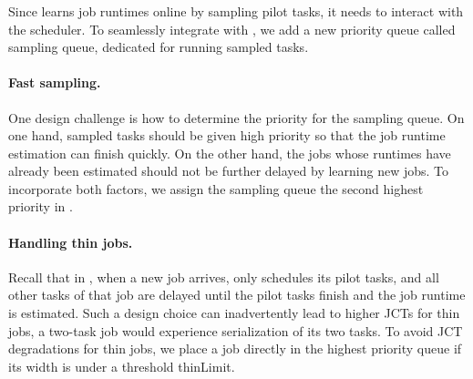 
\subsubsection{\slearn}
\label{sec:design:namepredict}

\rm{Since \slearn learns job runtimes online by sampling pilot tasks, it
needs to interact with the scheduler.}
To seamlessly integrate \slearn
with \gs, we add a new priority queue called sampling queue, dedicated
for running sampled tasks.


\paragraph{Fast sampling.}
One design challenge is how to determine the priority for the sampling queue.
On one hand, sampled tasks should be given high priority so that the job
runtime estimation can finish quickly. On the other hand, the jobs whose
runtimes have already been estimated should not be further delayed by learning
new jobs. To incorporate both factors, we assign the sampling queue the second
highest priority in \gs.

\paragraph{Handling thin jobs.}
Recall that in \name, when a new job arrives, \name only schedules its pilot
tasks, and all other tasks of that job are delayed until the pilot tasks finish
and the job runtime is estimated. Such a design choice can inadvertently lead
to higher JCTs for thin jobs, \eg a two-task job would experience serialization
of its two tasks. To avoid JCT degradations for thin jobs, we place a job
directly in the highest priority queue if its width is under a threshold thinLimit.

